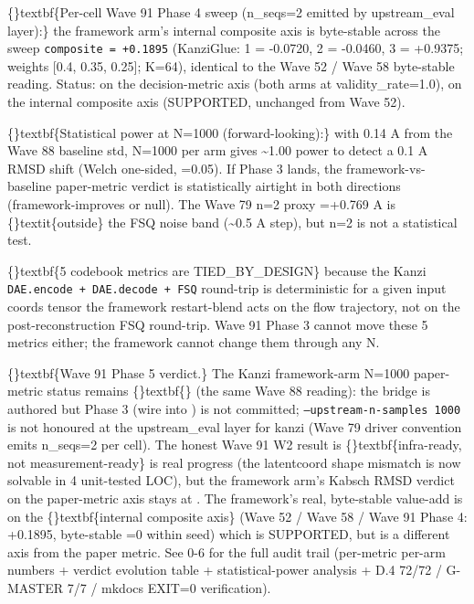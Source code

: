 \documentclass{article}
\begin{document}
\{\}textbf\{Per-cell Wave 91 Phase 4 sweep (n\_seqs=2 emitted by upstream\_eval layer):\} the framework arm's internal composite axis is byte-stable across the sweep  \texttt{composite = +0.1895} (KanziGlue: 1 = -0.0720, 2 = -0.0460, 3 = +0.9375; weights [0.4, 0.35, 0.25]; K=64), identical to the Wave 52 / Wave 58 byte-stable reading. Status:  on the decision-metric axis (both arms at validity\_rate=1.0),  on the internal composite axis (SUPPORTED, unchanged from Wave 52).

\{\}textbf\{Statistical power at N=1000 (forward-looking):\} with   0.14 A from the Wave 88 baseline std, N=1000 per arm gives \textasciitilde{}1.00 power to detect a 0.1 A RMSD shift (Welch one-sided, =0.05). If Phase 3 lands, the framework-vs-baseline paper-metric verdict is statistically airtight in both directions (framework-improves or null). The Wave 79 n=2 proxy =+0.769 A is \{\}textit\{outside\} the FSQ noise band (\textasciitilde{}0.5 A step), but n=2 is not a statistical test.

\{\}textbf\{5 codebook metrics are TIED\_BY\_DESIGN\} because the Kanzi \texttt{DAE.encode + DAE.decode + FSQ} round-trip is deterministic for a given input coords tensor  the framework restart-blend acts on the flow trajectory, not on the post-reconstruction FSQ round-trip. Wave 91 Phase 3 cannot move these 5 metrics either; the framework cannot change them through any N.

\{\}textbf\{Wave 91 Phase 5 verdict.\} The Kanzi framework-arm N=1000 paper-metric status remains \{\}textbf\{\} (the same Wave 88 reading): the bridge is authored but Phase 3 (wire into ) is not committed; \texttt{--upstream-n-samples 1000} is not honoured at the upstream\_eval layer for kanzi (Wave 79 driver convention emits n\_seqs=2 per cell). The honest Wave 91 W2 result is \{\}textbf\{infra-ready, not measurement-ready\}   is real progress (the latentcoord shape mismatch is now solvable in 4 unit-tested LOC), but the framework arm's Kabsch RMSD verdict on the paper-metric axis stays at . The framework's real, byte-stable value-add is on the \{\}textbf\{internal composite axis\} (Wave 52 / Wave 58 / Wave 91 Phase 4: +0.1895, byte-stable =0 within seed)  which is SUPPORTED, but is a different axis from the paper metric. See  0-6 for the full audit trail (per-metric per-arm numbers + verdict evolution table + statistical-power analysis + D.4 72/72 / G-MASTER 7/7 / mkdocs EXIT=0 verification).
\end{document}
